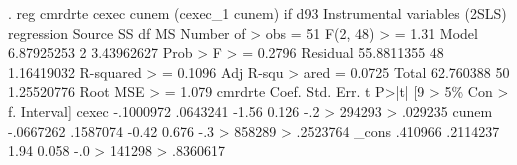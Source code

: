 . reg cmrdrte cexec cunem (cexec_1 cunem) if d93
{\smallskip}
Instrumental variables (2SLS) regression
{\smallskip}
      Source {\VBAR}       SS           df       MS      Number of
>  obs   =        51
   F(2, 48) 
>        =      1.31
       Model {\VBAR}  6.87925253         2  3.43962627   Prob > F 
>        =    0.2796
    Residual {\VBAR}  55.8811355        48  1.16419032   R-squared
>        =    0.1096
   Adj R-squ
> ared   =    0.0725
       Total {\VBAR}   62.760388        50  1.25520776   Root MSE 
>        =     1.079
{\smallskip}
     cmrdrte {\VBAR}      Coef.   Std. Err.      t    P>|t|     [9
> 5\% Con                                                    
>       f. Interval]
       cexec {\VBAR}  -.1000972   .0643241    -1.56   0.126    -.2
> 294293                                                    
>            .029235
       cunem {\VBAR}  -.0667262   .1587074    -0.42   0.676    -.3
> 858289                                                    
>           .2523764
       _cons {\VBAR}    .410966   .2114237     1.94   0.058    -.0
> 141298                                                    
>           .8360617
{\smallskip}

